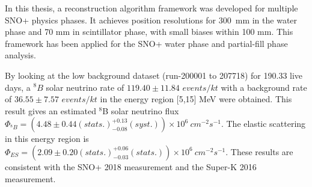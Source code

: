 In this thesis, a reconstruction algorithm framework was developed for multiple SNO+ physics phases. It achieves position resolutions for 300~mm in the water phase and 70 mm in scintillator phase, with small biases within 100 mm. This framework has been applied for the SNO+ water phase and partial-fill phase analysis. 

By looking at the low background dataset (run-200001 to 207718) for 190.33 live days, a $^8B$ solar neutrino rate of $119.40\pm11.84$ $events/kt$ with a background rate of $36.55\pm7.57$ $events/kt$ in the energy region [5,15] MeV were obtained. This result gives an estimated $^8$B solar neutrino flux $\Phi_{^8B}=(4.48 \pm 0.44(stats.)^{+0.13}_{-0.08}(syst.))\times10^6~cm^{-2}s^{-1}$. The elastic scattering in this energy region is $\Phi_{ES}=(2.09 \pm 0.20(stats.)^{+0.06}_{-0.03}(stats.))\times10^6~cm^{-2}s^{-1}$. These results are consistent with the SNO+ 2018 measurement\cite{anderson2019measurement} and the Super-K 2016 measurement\cite{abe2016solar}.


